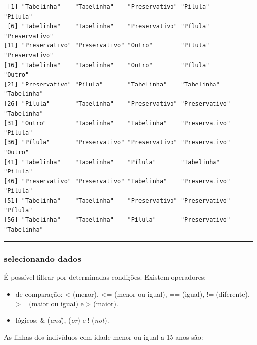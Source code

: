 \documentclass[
]{article}
\newenvironment{Shaded}{\begin{snugshade}}{\end{snugshade}}
\newcommand{\DecValTok}[1]{\textcolor[rgb]{0.00,0.00,0.81}{#1}}
\newcommand{\FunctionTok}[1]{\textcolor[rgb]{0.00,0.00,0.00}{#1}}
\newcommand{\NormalTok}[1]{#1}
\newcommand{\OtherTok}[1]{\textcolor[rgb]{0.56,0.35,0.01}{#1}}
\newcommand{\SpecialCharTok}[1]{\textcolor[rgb]{0.00,0.00,0.00}{#1}}
\providecommand{\tightlist}{%
  \setlength{\itemsep}{0pt}\setlength{\parskip}{0pt}}
\begin{document}
\begin{verbatim}
 [1] "Tabelinha"    "Tabelinha"    "Preservativo" "Pílula"       "Pílula"      
 [6] "Tabelinha"    "Tabelinha"    "Preservativo" "Pílula"       "Preservativo"
[11] "Preservativo" "Preservativo" "Outro"        "Pílula"       "Preservativo"
[16] "Tabelinha"    "Tabelinha"    "Outro"        "Pílula"       "Outro"       
[21] "Preservativo" "Pílula"       "Tabelinha"    "Tabelinha"    "Tabelinha"   
[26] "Pílula"       "Tabelinha"    "Preservativo" "Preservativo" "Tabelinha"   
[31] "Outro"        "Tabelinha"    "Tabelinha"    "Preservativo" "Pílula"      
[36] "Pílula"       "Preservativo" "Preservativo" "Preservativo" "Outro"       
[41] "Tabelinha"    "Tabelinha"    "Pílula"       "Tabelinha"    "Pílula"      
[46] "Preservativo" "Preservativo" "Tabelinha"    "Preservativo" "Pílula"      
[51] "Tabelinha"    "Tabelinha"    "Preservativo" "Preservativo" "Pílula"      
[56] "Tabelinha"    "Tabelinha"    "Pílula"       "Preservativo" "Tabelinha"   
\end{verbatim}

\begin{center}\rule{0.5\linewidth}{0.5pt}\end{center}

\hypertarget{selecionando-dados}{%
\subsubsection{selecionando dados}\label{selecionando-dados}}

É possível filtrar por determinadas condições. Existem operadores:

\begin{itemize}
\tightlist
\item
  de comparação: \textless{} (menor), \textless= (menor ou igual), ==
  (igual), != (diferente), \textgreater= (maior ou igual) e
  \textgreater{} (maior).
\item
  lógicos: \& (\emph{and}), \textbar{} (\emph{or}) e ! (\emph{not}).
\end{itemize}

As linhas dos indivíduos com idade menor ou igual a 15 anos são:

\begin{Shaded}
\end{Shaded}
\end{document}
